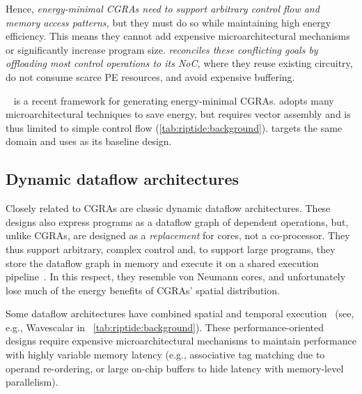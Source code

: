 Hence, \emph{energy-minimal CGRAs need to support
arbitrary control flow and memory access patterns,}
%
but they must do so while maintaining high energy efficiency.
%
This means they cannot add expensive microarchitectural mechanisms
or significantly increase program size.
%
\emph{\riptide reconciles these conflicting goals by offloading most control
operations to its NoC,} where they reuse existing circuitry, do not consume scarce PE resources, and avoid expensive buffering.

\snafu~\cite{snafu} is a recent framework for generating
energy-minimal CGRAs.
%
\snafu adopts many microarchitectural techniques to save energy,
but requires vector assembly and is thus limited to simple control flow (\autoref{tab:riptide:background}).
%
\riptide targets the same domain and uses \snafu as its baseline design.


\subsection{Dynamic dataflow architectures}

Closely related to CGRAs are classic dynamic dataflow architectures.
% 
These designs also express programs as a dataflow graph of dependent operations, but, unlike CGRAs, are designed as a \emph{replacement} for cores, not a co-processor.
%
They thus support arbitrary, complex control
%
and, to support large programs, they store the dataflow graph in memory and execute it on a shared execution pipeline~\cite{swanson2003wavescalar,ttda,monsoon,dennis1975preliminary}.
%
In this respect, they resemble von Neumann cores, and unfortunately lose much of the energy benefits of CGRAs' spatial distribution.

Some dataflow architectures have combined spatial and temporal execution~\cite{trips,raw,swanson2003wavescalar,mishra2006tartan,parashar2013triggered,voitsechov2014single,voitsechov2018inter} (see, e.g., Wavescalar in ~\autoref{tab:riptide:background}).
%
These performance-oriented designs require expensive microarchitectural mechanisms
to maintain performance with highly variable memory latency
(e.g., associative tag matching due to operand re-ordering, or large on-chip buffers to hide latency with memory-level parallelism).

